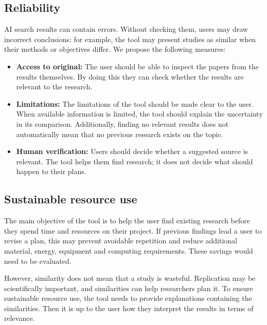 \documentclass[11pt,a4paper]{article}
\begin{document}
\subsection*{Reliability}
AI search results can contain errors. Without checking them, users may draw incorrect conclusions: for example, the tool may present studies as similar when their methods or objectives differ. We propose the following measures:

\begin{itemize}[leftmargin=*]
    \item \textbf{Access to original:} The user should be able to inspect the papers from the results themselves. By doing this they can check whether the results are relevant to the research.

    \item \textbf{Limitations:} The limitations of the tool should be made clear to the user. When available information is limited, the tool should explain the uncertainty in its comparison. Additionally, finding no relevant results does not automatically mean that no previous research exists on the topic.

    \item \textbf{Human verification:} Users should decide whether a suggested source is relevant. The tool helps them find research; it does not decide what should happen to their plans.
\end{itemize}

\subsection*{Sustainable resource use}
The main objective of the tool is to help the user find existing research before they spend time and resources on their project. If previous findings lead a user to revise a plan, this may prevent avoidable repetition and reduce additional material, energy, equipment and computing requirements. These savings would need to be evaluated. \par
However, similarity does not mean that a study is wasteful. Replication may be scientifically important, and similarities can help researchers plan it. To ensure sustainable resource use, the tool needs to provide explanations containing the similarities. Then it is up to the user how they interpret the results in terms of relevance.
\end{document}
